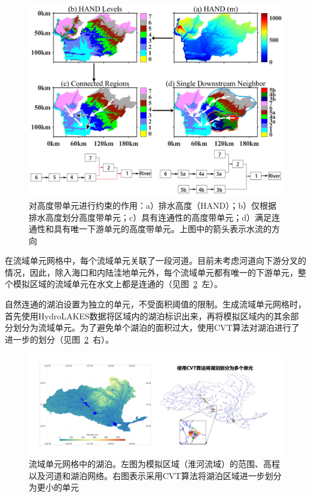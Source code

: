 {
  \begin{figure}[htbp]
    \centering
    \includegraphics[width=\textwidth]{Figures/模式构架/高度带单元的约束示意图.jpg}
    \caption[对高度带单元进行约束的作用]{对高度带单元进行约束的作用：a）排水高度（HAND）；b）仅根据排水高度划分高度带单元；c）具有连通性的高度带单元；d）满足连通性和具有唯一下游单元的高度带单元。上图中的箭头表示水流的方向}
    \label{fig:高度带单元约束示意}
  \end{figure}
}

在流域单元网格中，每个流域单元关联了一段河道。目前未考虑河道向下游分叉的情况，因此，除入海口和内陆洼地单元外，每个流域单元都有唯一的下游单元，整个模拟区域的流域单元在水文上都是连通的（见图~\ref{fig:湖泊划分}~左）。

自然连通的湖泊设置为独立的单元，不受面积阈值的限制。生成流域单元网格时，首先使用HydroLAKES数据\citep{messager2016nc}将区域内的湖泊标识出来，再将模拟区域内的其余部分划分为流域单元。为了避免单个湖泊的面积过大，使用CVT算法\citep{du1999siam}对湖泊进行了进一步的划分（见图~\ref{fig:湖泊划分}~右）。
{
  \begin{figure}[htbp]
    \centering
    \includegraphics[width=\textwidth]{Figures/模式构架/湖泊划分.jpg}
    \caption[流域单元网格中的湖泊]{流域单元网格中的湖泊。左图为模拟区域（淮河流域）的范围、高程以及河道和湖泊网络。右图表示采用CVT算法将湖泊区域进一步划分为更小的单元}
    \label{fig:湖泊划分}
  \end{figure}
}




